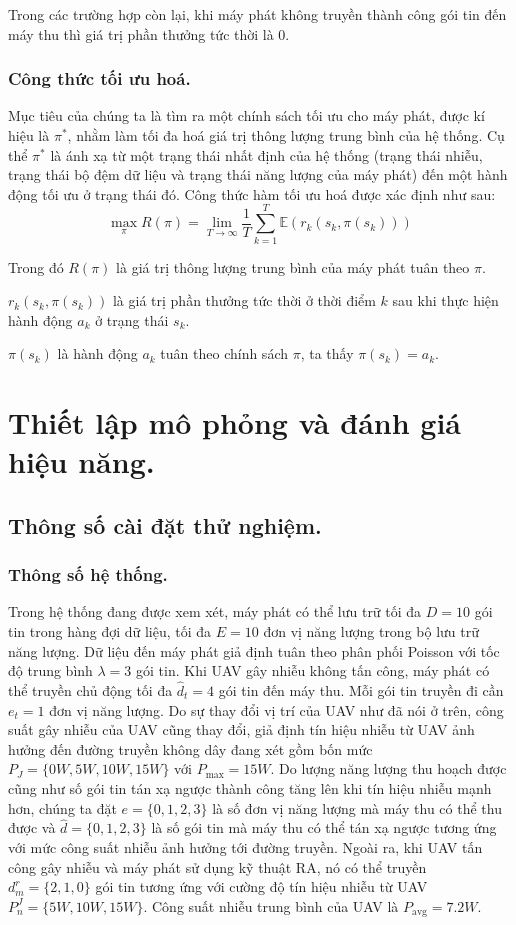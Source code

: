 \documentclass{uetgraduation}
\begin{document}
Trong các trường hợp còn lại, khi máy phát không truyền thành công gói tin đến máy thu thì giá trị phần thưởng tức thời là 0.


\subsection{Công thức tối ưu hoá.}
Mục tiêu của chúng ta là tìm ra một chính sách tối ưu cho máy phát, được kí hiệu là $\pi^*$, nhằm làm tối đa hoá giá trị thông lượng trung bình
của hệ thống. Cụ thể $\pi^*$ là ánh xạ từ một trạng thái nhất định của hệ thống (trạng thái nhiễu, trạng thái bộ đệm dữ liệu và trạng thái năng
lượng của máy phát) đến một hành động tối ưu ở trạng thái đó.
Công thức hàm tối ưu hoá được xác định như sau:
\[
\max_{\pi} R(\pi) = \lim_{T \to \infty} \frac{1}{T} \sum_{k=1}^{T} \mathbb{E} \left( r_k(s_k, \pi(s_k)) \right)
\]

Trong đó $R(\pi)$ là giá trị thông lượng trung bình của máy phát tuân theo $\pi$.

$r_k(s_k, \pi(s_k))$ là giá trị phần thưởng tức thời ở thời điểm $k$ sau khi thực hiện hành động $a_k$ ở trạng thái $s_k$. 

$\pi(s_k)$ là hành động $a_k$ tuân theo chính sách $\pi$, ta thấy $\pi(s_k) = a_k$.


\chapter{Thiết lập mô phỏng và đánh giá hiệu năng.}
\section{Thông số cài đặt thử nghiệm.}
\subsection{Thông số hệ thống.}
Trong hệ thống đang được xem xét, máy phát có thể lưu trữ tối đa $D = 10$ gói tin trong hàng đợi dữ liệu, tối đa $E = 10$ đơn vị năng lượng
trong bộ lưu trữ năng lượng. Dữ liệu đến máy phát giả định tuân theo phân phối Poisson với tốc độ trung bình $\lambda = 3$ 
gói tin. Khi UAV gây nhiễu không tấn công, máy phát có thể truyền chủ động tối đa $\hat{d}_t = 4$ gói tin đến máy thu. Mỗi gói tin truyền đi cần
$e_t = 1$ đơn vị năng lượng. Do sự thay đổi vị trí của UAV như đã nói ở trên, công suất gây nhiễu của UAV cũng thay đổi, giả định tín hiệu nhiễu từ 
UAV ảnh hưởng đến đường truyền không dây đang xét gồm bốn mức $P_J = \{0W, 5W, 10W, 15W\}$ với $P_{\text{max}} = 15W$. Do lượng năng lượng
thu hoạch được cũng như số gói tin tán xạ ngược thành công tăng lên khi tín hiệu nhiễu mạnh hơn, chúng ta đặt $e = \{0, 1, 2, 3\}$ là số đơn vị
năng lượng mà máy thu có thể thu được và $\hat{d} = \{0, 1, 2, 3\}$ là số gói tin mà máy thu có thể tán xạ ngược tương ứng với mức công suất nhiễu
ảnh hưởng tới đường truyền. Ngoài ra, khi UAV tấn công gây nhiễu và máy phát sử dụng kỹ thuật RA, nó có thể truyền $d^r_m = \{2, 1, 0\}$ gói tin
tương ứng với cường độ tín hiệu nhiễu từ UAV $P^J_n = \{5W, 10W, 15W\}$. Công suất nhiễu trung bình của UAV là $P_\text{avg} = 7.2W$.
\end{document}
